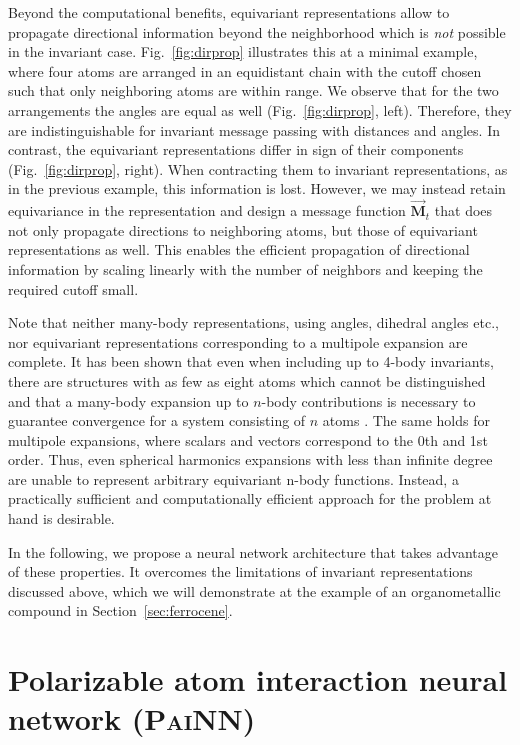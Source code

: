 \documentclass[reprint,
amsmath,amssymb,
 aip,jcp
]{revtex4-2}
\newcommand{\painn}{\textsc{PaiNN}}
\newcommand{\q}{\mathbf{s}}
\newcommand{\mmu}{\vec{\mathbf{v}}}
\newcommand{\new}[1]{#1}
\begin{document}
Beyond the computational benefits, equivariant representations allow to propagate directional information beyond the neighborhood which is \emph{not} possible in the invariant case.
Fig.~\ref{fig:dirprop} illustrates this at a minimal example, where four atoms are arranged in an equidistant chain with the cutoff chosen such that only neighboring atoms are within range.
We observe that for the two arrangements the angles are equal as well (Fig.~\ref{fig:dirprop}, left).
Therefore, they are indistinguishable for invariant message passing with distances and angles.
In contrast, the equivariant representations differ in sign of their components (Fig.~\ref{fig:dirprop}, right).
When contracting them to invariant representations, as in the previous example, this information is lost.
However, we may instead retain equivariance in the representation and design a message function $\vec{\mathbf{M}}_t$ that does not only propagate directions to neighboring atoms, but those of equivariant representations as well.
This enables the efficient propagation of directional information by scaling linearly with the number of neighbors and keeping the required cutoff small.

\new{Note that neither many-body representations, using angles, dihedral angles etc., nor equivariant representations corresponding to a multipole expansion are complete.
It has been shown that even when including up to 4-body invariants, there are structures with as few as eight atoms which cannot be distinguished \cite{pozdnyakov2020incompleteness}{}  and that a many-body expansion up to $n$-body contributions is necessary to guarantee convergence for a system consisting of $n$ atoms \cite{hermann2007convergence}. The same holds for multipole expansions, where scalars and vectors correspond to the 0th and 1st order.
Thus, even spherical harmonics expansions with less than infinite degree are unable to represent arbitrary equivariant n-body functions.
Instead, a practically sufficient and computationally efficient approach for the problem at hand is desirable.}

In the following, we propose a neural network architecture that takes advantage of these properties. 
It overcomes the limitations of invariant representations discussed above, which we will demonstrate at the example of an organometallic compound in Section~\ref{sec:ferrocene}.

\section{Polarizable atom interaction neural network (\painn{})}
\end{document}
